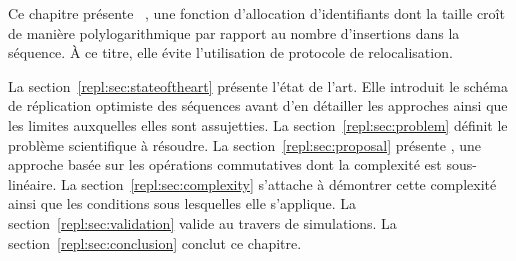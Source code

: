 Ce chapitre présente \LSEQ~\cite{nedelec2013concurrency, nedelec2013lseq}, une
fonction d'allocation d'identifiants dont la taille croît de manière
polylogarithmique par rapport au nombre d'insertions dans la séquence. À ce
titre, elle évite l'utilisation de protocole de relocalisation.

La section~\ref{repl:sec:stateoftheart} présente l'état de l'art. Elle introduit
le schéma de réplication optimiste des séquences avant d'en détailler les
approches ainsi que les limites auxquelles elles sont assujetties.  La
section~\ref{repl:sec:problem} définit le problème scientifique à résoudre. La
section~\ref{repl:sec:proposal} présente \LSEQ, une approche basée sur les
opérations commutatives dont la complexité est sous-linéaire. La
section~\ref{repl:sec:complexity} s'attache à démontrer cette complexité ainsi
que les conditions sous lesquelles elle s'applique. La
section~\ref{repl:sec:validation} valide \LSEQ au travers de simulations. La
section~\ref{repl:sec:conclusion} conclut ce chapitre.


